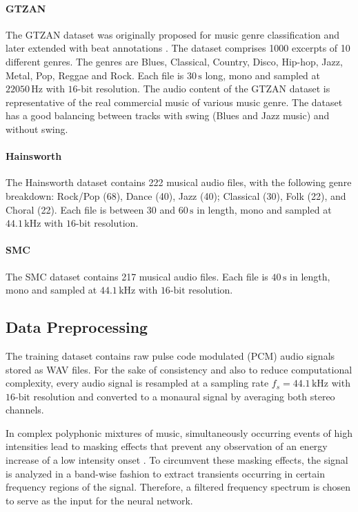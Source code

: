 \documentclass{scrartcl}
\begin{document}
\paragraph{GTZAN} 
The GTZAN \cite{Tzanetakis2002b} dataset was originally proposed for music genre classification and later extended with beat annotations \cite{marchand2015swing}. The dataset comprises 1000 excerpts of 10 different genres. The genres are Blues, Classical, Country, Disco, Hip-hop, Jazz, Metal, Pop, Reggae and Rock. Each file is $30\,\text{s}$ long, mono and sampled at $\num[group-separator={,}]{22050}\,\text{Hz}$ with $16\text{-bit}$ resolution. The audio content of the GTZAN dataset is representative of the real commercial music of various music genre. The dataset has a good balancing between tracks with swing (Blues and Jazz music) and without swing.

\paragraph{Hainsworth} 
The Hainsworth dataset \cite{Hainsworth2004} contains 222 musical audio files, with the following genre breakdown: Rock/Pop (68), Dance (40), Jazz (40); Classical (30), Folk (22), and Choral (22). Each file is between $30$ and $60\,\text{s}$ in length, mono and sampled at $44.1\,\text{kHz}$ with $16\text{-bit}$ resolution.

\paragraph{SMC}
The SMC dataset \cite{Holzapfel2012} contains 217 musical audio files. Each file is $40 \,\text{s}$ in length, mono and sampled at $44.1\,\text{kHz}$ with $16\text{-bit}$ resolution.


\subsection{Data Preprocessing}

The training dataset contains raw pulse code modulated (PCM) audio signals stored as WAV files. For the sake of consistency and also to reduce computational complexity, every audio signal is resampled at a sampling rate $f_s = 44.1 \,\text{kHz}$ with $16\text{-bit}$ resolution and converted to a monaural signal by averaging both stereo channels. 

In complex polyphonic mixtures of music, simultaneously occurring events of high intensities lead to masking effects that prevent any observation of an energy increase of a low intensity onset \cite{Grosche2010}. To circumvent these masking effects, the signal is analyzed in a band-wise fashion to extract transients occurring in certain frequency regions of the signal. Therefore, a filtered frequency spectrum is chosen to serve as the input for the neural network.
\end{document}
